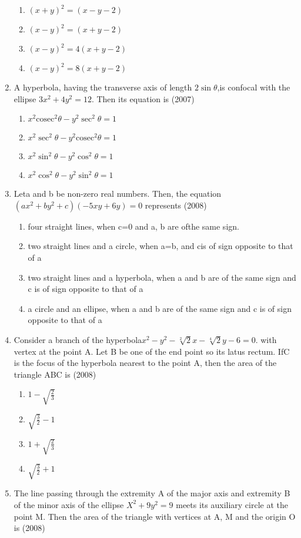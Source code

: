 \documentclass[12pt]{article}
\begin{document}
\begin{enumerate}
\begin{enumerate}
\item $(x+y)^2=(x-y-2)$
\item $(x-y)^2=(x+y-2)$
\item $(x-y)^2=4(x+y-2)$
\item $(x-y)^2=8(x+y-2)$
\end{enumerate}
\item A hyperbola, having the transverse axis of length $2 \sin\theta$,is confocal with the ellipse $3x^2+4y^2=12$. Then its equation is (2007)
\begin{enumerate}
\item $x^2 \mathrm{cosec}^2\theta-y^2\sec^2\theta= 1$
\item $x^2 \sec^2\theta-y^2\mathrm{cosec}^2\theta= 1$
\item $x^2 \sin^2\theta-y^2\cos^2\theta= 1$
\item $x^2 \cos^2\theta-y^2\sin^2\theta= 1$
\end{enumerate}
\item  Leta and b be non-zero real numbers. Then, the equation $(ax^2+by^2+c)(-5xy+6y) =0$ represents (2008)
\begin{enumerate}
\item four straight lines, when c=0 and a, b are ofthe same sign.
\item two straight lines and a circle, when a=b, and cis of sign opposite to that of a
\item two straight lines and a hyperbola, when a and b are of the same sign and c is of sign opposite to that of a
\item a circle and an ellipse, when a and b are of the same sign and c is of sign opposite to that of a 
\end{enumerate}
\item Consider a branch of the hyperbola$x^2-y^2-\sqrt[2]{2}x-\sqrt[4]{2}y-6=0$. with vertex at the point A. Let B be one of the end point so its latus rectum. IfC is the focus of the hyperbola nearest to the point A, then the area of the triangle ABC is (2008)
\begin{enumerate}
\item $1-\sqrt{\frac{2}{3}}$
\item $\sqrt{\frac{3}{2}}-1$
\item $1+\sqrt{\frac{2}{3}}$
\item $\sqrt{\frac{3}{2}}+1$
\end{enumerate}
\item  The line passing through the extremity A of the major axis and extremity B of the minor axis of the ellipse $X^2+9y^2=9$ meets its auxiliary circle at the point M. Then the area of the triangle with vertices at A, M and the origin O is (2008)

\end{enumerate}
\end{document}
